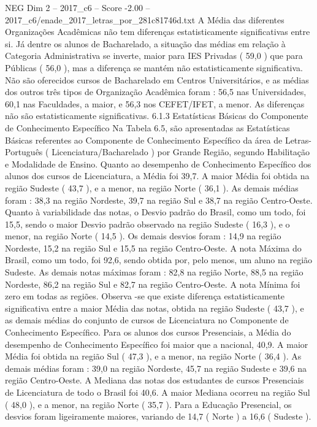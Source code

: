 \begin{textsample}{NEG Dim 2 – 2017\_c6 – Score -2.00 – 2017\_c6/enade\_2017\_letras\_por\_281c81746d.txt}
A Média das diferentes Organizações Acadêmicas não tem diferenças estatisticamente significativas entre si.
Já dentre os alunos de Bacharelado, a situação das médias em relação à Categoria Administrativa se inverte, maior para IES Privadas ( 59,0 ) que para Públicas ( 56,0 ), mas a diferença se mantém não estatisticamente significativa.
Não são oferecidos cursos de Bacharelado em Centros Universitários, e as médias dos outros três tipos de Organização Acadêmica foram : 56,5 nas Universidades, 60,1 nas Faculdades, a maior, e 56,3 nos CEFET/IFET, a menor.
As diferenças não são estatisticamente significativas. 6.1.3 Estatísticas Básicas do Componente de Conhecimento Específico Na Tabela 6.5, são apresentadas as Estatísticas Básicas referentes ao Componente de Conhecimento Específico da área de Letras-Português ( Licenciatura/Bacharelado ) por Grande Região, segundo Habilitação e Modalidade de Ensino.
Quanto ao desempenho de Conhecimento Específico dos alunos dos cursos de Licenciatura, a Média foi 39,7.
A maior Média foi obtida na região Sudeste ( 43,7 ), e a menor, na região Norte ( 36,1 ).
As demais médias foram : 38,3 na região Nordeste, 39,7 na região Sul e 38,7 na região Centro-Oeste.
Quanto à variabilidade das notas, o Desvio padrão do Brasil, como um todo, foi 15,5, sendo o maior Desvio padrão observado na região Sudeste ( 16,3 ), e o menor, na região Norte ( 14,5 ).
Os demais desvios foram : 14,9 na região Nordeste, 15,2 na região Sul e 15,5 na região Centro-Oeste.
A nota Máxima do Brasil, como um todo, foi 92,6, sendo obtida por, pelo menos, um aluno na região Sudeste.
As demais notas máximas foram : 82,8 na região Norte, 88,5 na região Nordeste, 86,2 na região Sul e 82,7 na região Centro-Oeste.
A nota Mínima foi zero em todas as regiões.
Observa -se que existe diferença estatisticamente significativa entre a maior Média das notas, obtida na região Sudeste ( 43,7 ), e as demais médias do conjunto de cursos de Licenciatura no Componente de Conhecimento Específico.
Para os alunos dos cursos Presenciais, a Média do desempenho de Conhecimento Específico foi maior que a nacional, 40,9.
A maior Média foi obtida na região Sul ( 47,3 ), e a menor, na região Norte ( 36,4 ).
As demais médias foram : 39,0 na região Nordeste, 45,7 na região Sudeste e 39,6 na região Centro-Oeste.
A Mediana das notas dos estudantes de cursos Presenciais de Licenciatura de todo o Brasil foi 40,6.
A maior Mediana ocorreu na região Sul ( 48,0 ), e a menor, na região Norte ( 35,7 ).
Para a Educação Presencial, os desvios foram ligeiramente maiores, variando de 14,7 ( Norte ) a 16,6 ( Sudeste ).

\end{textsample}

